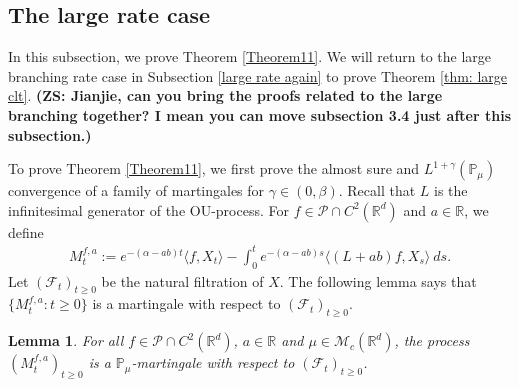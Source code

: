 \documentclass[12pt,a4paper]{amsart}
\theoremstyle{plain}
\newtheorem{lem}[thm]{Lemma}
\theoremstyle{definition}
\numberwithin{equation}{section}
\begin{document}
\subsection{The large rate case}

    In this subsection, we prove Theorem \ref{Theorem11}. 
    We will return to the large branching rate case in Subsection \ref{large rate again} to prove Theorem \ref{thm: large clt}.
    {\bf (ZS: Jianjie, can you bring the proofs related to the large branching together? I mean you can move subsection 3.4 just after this subsection.)}

    To prove Theorem \ref{Theorem11}, we first prove the almost sure and $L^{1+\gamma}(\mathbb{P}_{\mu})$ convergence of a family of martingales for $\gamma\in (0, \beta)$. Recall that $L$ is the infinitesimal generator of the OU-process.  For $f\in \mathcal{P}\cap C^2(\mathbb R^d)$ and  $a\in \mathbb R$, we define 
\begin{equation}\begin{split}
\label{defmartingale}
    M_t^{f,a}
    :=e^{-(\alpha-ab)t}\langle f,X_t\rangle-\int_0^t e^{-(\alpha-ab)s}\langle (L+ab)f, X_s\rangle~ ds.
\end{split}\end{equation}
    Let $(\mathscr{F}_t)_{t\geq 0}$ be the natural filtration of $X$.  The following lemma says that $\{M_t^{f,a}: t\geq 0\}$ is a martingale with respect to $(\mathscr{F}_t)_{t\geq 0}$.
\begin{lem}
\label{lemma25}
    For all $f\in \mathcal{P}\cap C^2(\mathbb R^d)$, $a\in \mathbb R$ and $\mu\in \mathcal M_c(\mathbb R^d)$, the process $(M_t^{f,a})_{t\geq 0}$ is a $\mathbb P_\mu$-martingale with respect to $(\mathscr F_t)_{t\geq 0}$.
\end{lem}
\end{document}
